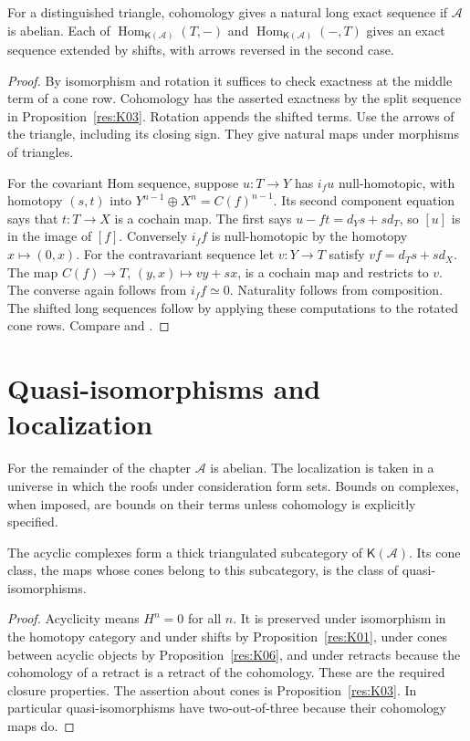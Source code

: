 \begin{proposition}\label{res:K06}
For a distinguished triangle, cohomology gives a natural long exact
sequence if \(\mathcal A\) is abelian. Each of
\(\operatorname{Hom}_{\mathsf K(\mathcal A)}(T,-)\) and
\(\operatorname{Hom}_{\mathsf K(\mathcal A)}(-,T)\) gives an exact
sequence extended by shifts, with arrows reversed in the second case.
\end{proposition}
\begin{proof}
By isomorphism and rotation it suffices to check exactness at the
middle term of a cone row. Cohomology has the asserted exactness by
the split sequence in Proposition~\ref{res:K03}. Rotation appends the
shifted terms. Use the arrows of the triangle, including its
closing sign. They give natural maps under morphisms of triangles.

For the covariant Hom sequence, suppose \(u:T\to Y\) has \(i_fu\)
null-homotopic, with homotopy \((s,t)\) into
\(Y^{n-1}\oplus X^n=C(f)^{n-1}\). Its second component equation says
that \(t:T\to X\) is a cochain map. The first says
\(u-ft=d_Ys+s d_T\), so \([u]\) is in the image of \([f]\).
Conversely \(i_ff\) is null-homotopic by the homotopy \(x\mapsto(0,x)\).
For the contravariant sequence let \(v:Y\to T\) satisfy
\(vf=d_Ts+s d_X\). The map \(C(f)\to T\),
\((y,x)\mapsto vy+sx\), is a cochain map and restricts to \(v\).
The converse again follows from \(i_ff\simeq0\). Naturality follows
from composition. The shifted long sequences follow by applying
these computations to the rotated cone rows.
Compare \cite[Tags 0149 and 05RS]{stacks-derived} and
\cite[Propositions 5.2.6--5.2.7]{yekutieli}.
\end{proof}

\section{Quasi-isomorphisms and localization}

For the remainder of the chapter \(\mathcal A\) is abelian. The
localization is taken in a universe in which the roofs under
consideration form sets. Bounds on complexes, when imposed, are bounds
on their terms unless cohomology is explicitly specified.

\begin{proposition}\label{res:D01}
The acyclic complexes form a thick triangulated subcategory of
\(\mathsf K(\mathcal A)\). Its cone class, the maps whose cones belong
to this subcategory, is the class of quasi-isomorphisms.
\end{proposition}
\begin{proof}
Acyclicity means \(H^n=0\) for all \(n\). It is preserved under
isomorphism in the homotopy category and under shifts by
Proposition~\ref{res:K01}, under cones between acyclic objects by
Proposition~\ref{res:K06}, and under retracts because the cohomology of
a retract is a retract of the cohomology. These are the required
closure properties. The assertion about cones is
Proposition~\ref{res:K03}. In particular quasi-isomorphisms have
two-out-of-three because their cohomology maps do.
\end{proof}

